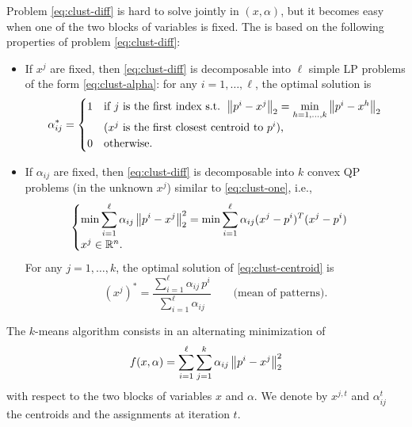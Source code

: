 Problem \eqref{eq:clust-diff} is hard to solve jointly in $(x,\alpha)$, but it becomes easy when one of the two blocks of variables is fixed. The  is based on the following properties of problem \eqref{eq:clust-diff}:
\begin{itemize}
    \item If $x^j$ are fixed, then \eqref{eq:clust-diff} is decomposable into $\ell$ simple LP problems of the form \eqref{eq:clust-alpha}: for any $i=1,\dots,\ell$, the optimal solution is
    \[
    \alpha_{ij}^* =
    \begin{cases}
    1 & \text{if } j \text{ is the first index s.t. } \left\lVert p^i - x^j \right\rVert_2 = \min\limits_{h=1,\dots,k} \left\lVert p^i - x^h \right\rVert_2\\
      & \text{($x^j$ is the first closest centroid to $p^i$),}\\
    0 & \text{otherwise.}
    \end{cases}
    \]
    \item If $\alpha_{ij}$ are fixed, then \eqref{eq:clust-diff} is decomposable into $k$ convex QP problems (in the unknown $x^j$) similar to \eqref{eq:clust-one}, i.e.,
    \begin{equation}\label{eq:clust-centroid}
    \begin{cases}
    \displaystyle \min \sum_{i=1}^{\ell} \alpha_{ij}\left\lVert p^i - x^j \right\rVert_2^2 = \min \sum_{i=1}^{\ell} \alpha_{ij}(x^j-p^i)^T(x^j-p^i)\\[1ex]
    x^j \in \mathbb{R}^n.
    \end{cases}
    \end{equation}
    For any $j=1,\dots,k$, the optimal solution of \eqref{eq:clust-centroid} is
    \[
    (x^j)^* = \frac{\sum_{i=1}^{\ell} \alpha_{ij}\, p^i}{\sum_{i=1}^{\ell} \alpha_{ij}} \qquad \text{(mean of patterns).}
    \]
\end{itemize}

The $k$-means algorithm consists in an alternating minimization of
\[
f(x,\alpha) = \sum_{i=1}^{\ell}\sum_{j=1}^{k} \alpha_{ij}\left\lVert p^i - x^j \right\rVert_2^2
\]
with respect to the two blocks of variables $x$ and $\alpha$. We denote by $x^{j,t}$ and $\alpha_{ij}^t$ the centroids and the assignments at iteration $t$.

